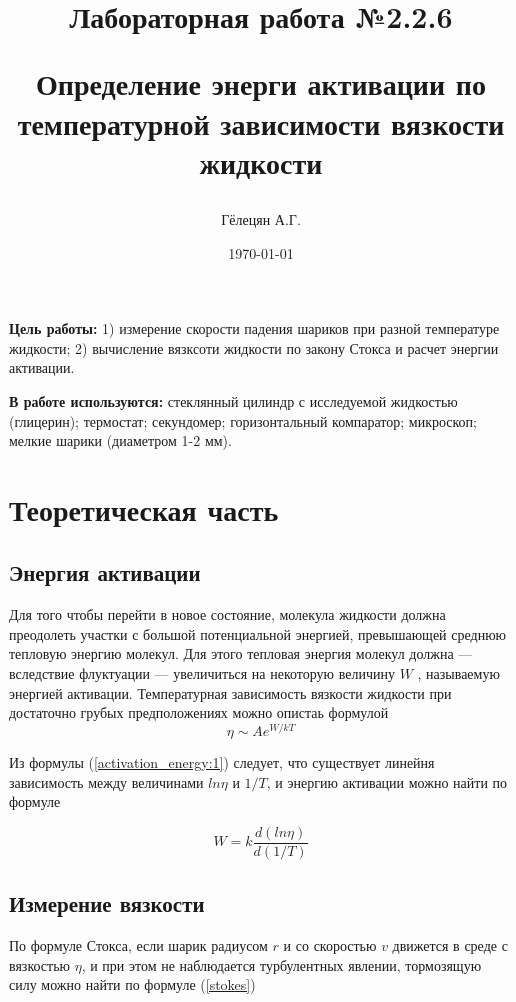 \documentclass[a4paper, 12pt]{article}
\title{\begin{center}Лабораторная работа №2.2.6\end{center}
Определение энерги активации по температурной зависимости вязкости жидкости}
\author{Гёлецян А.Г.}
\date{\today}
\begin{document}
    \maketitle
    \newpage


    \textbf{Цель работы:} 1) измерение скорости падения шариков при разной температуре жидкости; 2) вычисление вязксоти жидкости по закону Стокса и расчет энергии активации.

    \textbf{В работе используются:} стеклянный цилиндр с исследуемой жидкостью (глицерин); термостат; секундомер; горизонтальный компаратор; микроскоп; мелкие шарики (диаметром 1-2 мм).

    \section{Теоретическая часть}
    \subsection{Энергия активации}
    Для того чтобы перейти в новое состояние, молекула жидкости должна преодолеть участки с большой потенциальной энергией, превышающей среднюю тепловую энергию молекул. Для этого тепловая энергия молекул должна — вследствие флуктуации — увеличиться на некоторую величину $W$ , называемую энергией активации. Температурная зависимость вязкости жидкости при достаточно грубых предположениях можно опистаь формулой
    \begin{equation} \label{activation_energy:1}
        \eta \sim A e^{W/kT}
    \end{equation}

    Из формулы (\ref{activation_energy:1}) следует, что существует линейня зависимость между величинами $ln\eta$ и $1/T$, и энергию активации можно найти по формуле

    \begin{equation} \label{activation_energy:2}
        W = k \frac{d(ln\eta)}{d(1/T)}
    \end{equation}

    \subsection{Измерение вязкости}
    По формуле Стокса, если шарик радиусом $r$ и со скоростью $v$ движется в среде с вязкостью $\eta$, и при этом не наблюдается турбулентных явлении, тормозящую силу можно найти по формуле (\ref{stokes})
\end{document}
